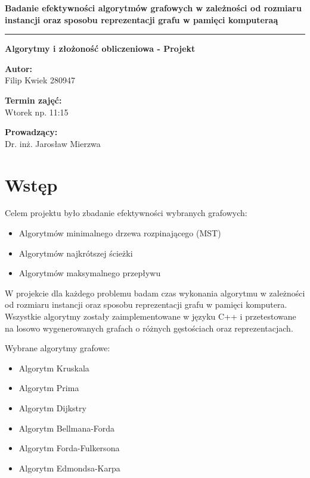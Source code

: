 \documentclass{article}
\begin{document}
\vspace{75pt}

\begin{center}
    \textbf{\large Badanie efektywności algorytmów grafowych w zależności od rozmiaru instancji oraz sposobu
reprezentacji grafu w pamięci komputeraą} 
    \vspace{2pt}
    \hrule
    \vspace{4pt}
    \textbf{\large Algorytmy i złożoność obliczeniowa - Projekt} 
\end{center}

\vspace{75pt}

\begin{center}
    \textbf{Autor: } \\
    Filip Kwiek 280947
\end{center}

\begin{center}
    \textbf{Termin zajęć: } \\
    Wtorek np. 11:15
\end{center}

\begin{center}
    \textbf{Prowadzący: } \\
    Dr. inż. Jarosław Mierzwa
\end{center}

\newpage
\tableofcontents
\newpage

\section{Wstęp}
Celem projektu było zbadanie efektywności wybranych grafowych:

\begin{itemize}
    \item Algorytmów minimalnego drzewa rozpinającego (MST)
    \item Algorytmów najkrótszej ścieżki
    \item Algorytmów maksymalnego przepływu
\end{itemize}

W projekcie dla każdego problemu badam czas wykonania algorytmu w zależności od rozmiaru instancji oraz sposobu reprezentacji grafu w pamięci komputera.
Wszystkie algorytmy zostały zaimplementowane w języku C++ i przetestowane na losowo wygenerowanych grafach o różnych gęstościach oraz reprezentacjach.

Wybrane algorytmy grafowe:
\begin{itemize}
    \item Algorytm Kruskala
    \item Algorytm Prima
    \item Algorytm Dijkstry
    \item Algorytm Bellmana-Forda
    \item Algorytm Forda-Fulkersona
    \item Algorytm Edmondsa-Karpa
\end{itemize}
\end{document}
